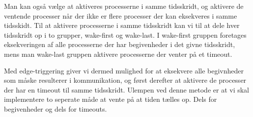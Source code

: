 Man kan også vælge at aktiveres processerne i samme tidsskridt, og aktivere de ventende processer når der ikke er flere processer der kan eksekveres i samme tidsskidt.
Til at aktivere processerne i samme tidsskridt kan vi  til at dele hver tidsskridt op i to grupper, wake-first og wake-last.
I wake-first gruppen foretages eksekveringen af alle processerne der har begivenheder i det givne tidsskridt, mens man wake-last gruppen  aktivere processerne der venter på et timeout.

Med  edge-triggering giver vi dermed mulighed for at eksekvere alle begivnheder som måske resulterer i kommunikation, og først derefter at aktivere de processer der har en timeout til samme tidsskridt.  Ulempen ved denne metode er at vi skal implementere to seperate måde at vente på at tiden tælles op. Dels for begivenheder og dels for timeouts.



